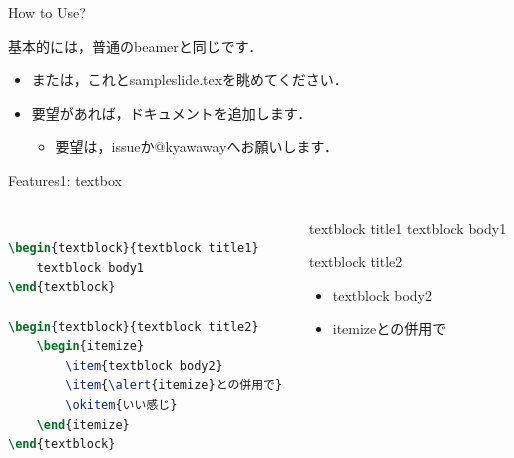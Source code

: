 \documentclass[aspectratio=1610,14pt]{beamer}
\begin{document}
\begin{frame}{How to Use?}
    \begin{textblock}{基本的には，普通のbeamerと同じです．}
        \begin{itemize}
            \item{または，これとsampleslide.texを眺めてください．}
            \item{要望があれば，ドキュメントを追加します．}
                \begin{itemize}
                    \item{要望は，issueか@kyawawayへお願いします．}
                \end{itemize}
        \end{itemize}
    \end{textblock}
\end{frame}

\begin{frame}[fragile]{Features1: textbox}
    \begin{columns}
        \begin{column}{0.5\textwidth}
            \begin{lstlisting}[language=TeX]
% using like other blocks

\begin{textblock}{textblock title1}
    textblock body1
\end{textblock}

\begin{textblock}{textblock title2}
    \begin{itemize}
        \item{textblock body2}
        \item{\alert{itemize}との併用で}
        \okitem{いい感じ}
    \end{itemize}
\end{textblock}
            \end{lstlisting}
        \end{column}
        \begin{column}{0.5\textwidth}
            \begin{textblock}{textblock title1}
                textblock body1
            \end{textblock}
            \begin{textblock}{textblock title2}
                \begin{itemize}
                    \item{textblock body2}
                    \item{\alert{itemize}との併用で}
                \end{itemize}
            \end{textblock}
        \end{column}
    \end{columns}
\end{frame}
\end{document}
